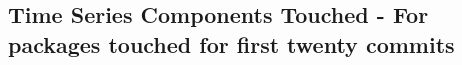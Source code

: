 \subsection{Time Series Components Touched - For packages touched for first twenty commits} 


\clearpage
